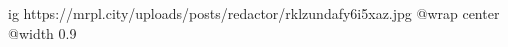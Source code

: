  
 
 
 
 

\ifcmt
  ig https://mrpl.city/uploads/posts/redactor/rklzundafy6i5xaz.jpg
  @wrap center
  @width 0.9
\fi
